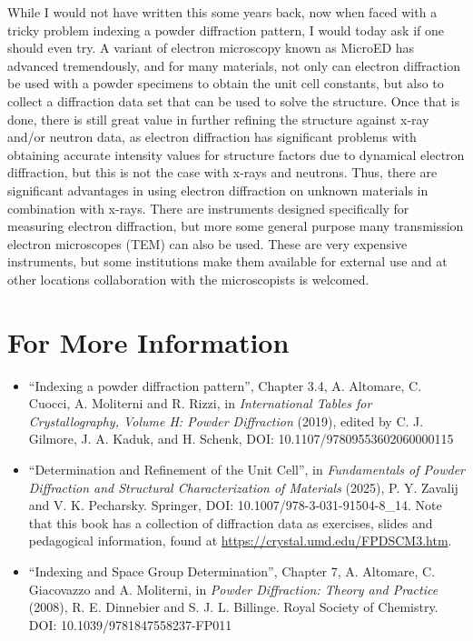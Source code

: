 While I would not have written this some years back, now when faced with a tricky problem indexing a powder diffraction pattern, I would today ask if one should even try. A variant of electron microscopy known as MicroED has advanced tremendously, and for many materials, not only can electron diffraction be used with a powder specimens to obtain the unit cell constants, but also to collect a diffraction data set that can be used to solve the structure. Once that is done, there is still great value in further refining the structure against x-ray and/or neutron data, as electron diffraction has significant problems with obtaining accurate intensity values for structure factors due to dynamical electron diffraction, but this is not the case with x-rays and neutrons. Thus, there are significant advantages in using electron diffraction on unknown materials in combination with x-rays. There are instruments designed specifically for measuring electron diffraction, but more some general purpose many transmission electron microscopes (TEM) can also be used. These are very expensive instruments, but some institutions make them available for external use and at other locations collaboration with the microscopists is welcomed. 

\section{For More Information}

\begin{itemize}
\item 
  ``Indexing a powder diffraction pattern'', Chapter 3.4,
    A. Altomare, C. Cuocci, A. Moliterni and R. Rizzi, in 
    \textit{International Tables for Crystallography, Volume H: Powder Diffraction} (2019), edited by C. J. Gilmore, J. A. Kaduk, and H. Schenk, DOI: 10.1107/97809553602060000115

\item
``Determination and Refinement of the Unit Cell'', in 
\textit{Fundamentals of Powder Diffraction and Structural Characterization of Materials} (2025), P. Y. Zavalij and V. K. Pecharsky. Springer, DOI: 10.1007/978-3-031-91504-8\_14. Note that this book has a collection of diffraction data as exercises, slides and pedagogical information, found at \url{https://crystal.umd.edu/FPDSCM3.htm}.

\item ``Indexing and Space Group Determination'', Chapter 7,  A. Altomare, C. Giacovazzo and A. Moliterni, in
\textit{Powder Diffraction: Theory and Practice} (2008), R. E. Dinnebier and S. J. L. Billinge. Royal Society of Chemistry.
DOI: 10.1039/9781847558237-FP011
\end{itemize}
